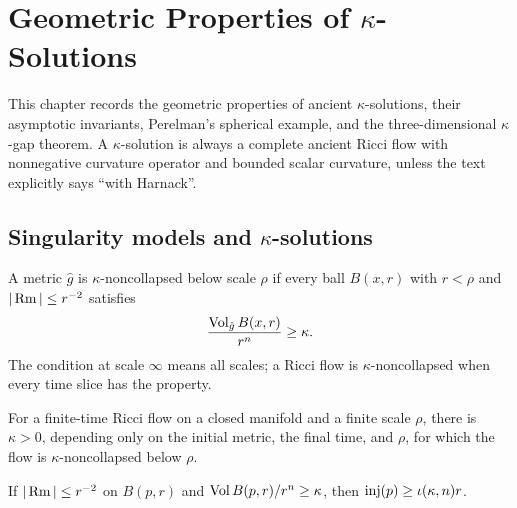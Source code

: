 \chapter{\texorpdfstring{Geometric Properties of $\kappa$-Solutions}{Geometric Properties of Kappa-Solutions}}
\label{ch:chow-iii-kappa-solutions}

This chapter records the geometric properties of ancient $\kappa$-solutions,
their asymptotic invariants, Perelman's spherical example, and the
three-dimensional $\kappa$-gap theorem.  A $\kappa$-solution is always a
complete ancient Ricci flow with nonnegative curvature operator and bounded
scalar curvature, unless the text explicitly says ``with Harnack''.

\section{\texorpdfstring{Singularity models and $\kappa$-solutions}{Singularity models and Kappa-solutions}}

\begin{definition}
\label{def:chow-iii-kappa-noncollapsed}
A metric $\hat g$ is $\kappa$-noncollapsed below scale $\rho$ if every ball
$B(x,r)$ with $r<\rho$ and $|\operatorname{Rm}|\le r^{-2}$ satisfies
\[
\frac{\operatorname{Vol}_{\hat g}B(x,r)}{r^n}\ge\kappa.
\]
The condition at scale $\infty$ means all scales; a Ricci flow is
$\kappa$-noncollapsed when every time slice has the property.
\end{definition}

\begin{theorem}
\label{thm:chow-iii-no-local-collapsing}
For a finite-time Ricci flow on a closed manifold and a finite scale $\rho$,
there is $\kappa>0$, depending only on the initial metric, the final time,
and $\rho$, for which the flow is $\kappa$-noncollapsed below $\rho$.
\end{theorem}

\begin{proposition}
\label{prop:chow-iii-cgt-injectivity}
If $|\operatorname{Rm}|\le r^{-2}$ on $B(p,r)$ and
$\operatorname{Vol} B(p,r)/r^n\ge\kappa$, then $\operatorname{inj}(p)\ge\iota(\kappa,n)r$.
\end{proposition}

